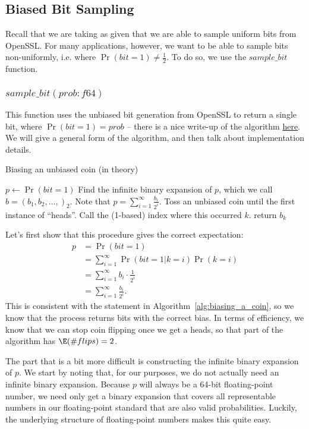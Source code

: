 \documentclass[11pt]{scrartcl} %
\begin{document}
\subsection{Biased Bit Sampling}
Recall that we are taking as given that we are able to sample uniform bits from OpenSSL.
For many applications, however, we want to be able to sample bits non-uniformly,
i.e. where $\Pr(bit = 1) \neq \frac{1}{2}$. To do so, we use the $sample\_bit$ function.

\subsubsection{$sample\_bit(prob: f64)$}
This function uses the unbiased bit generation from OpenSSL to return a single bit, where $\Pr(bit = 1) = prob$ --
there is a nice write-up of the algorithm \href{https://amakelov.wordpress.com/2013/10/10/arbitrarily-biasing-a-coin-in-2-expected-tosses/}{here}.
We will give a general form of the algorithm, and then talk about implementation details.
\begin{algorithm}[H]
	\caption{Biasing an unbiased coin (in theory)}
	\label{alg:biasing_a_coin_theory}
	\begin{algorithmic}[1]
		\State $p \gets \Pr(bit = 1)$
		\State Find the infinite binary expansion of $p$, which we call $b = (b_1, b_2, \hdots,)_2$.
		Note that $p = \sum_{i=1}^{\infty}\frac{b_i}{2^i}$.
		\State Toss an unbiased coin until the first instance of ``heads''. Call the (1-based) index where this occurred $k$.
		\State return $b_k$
	\end{algorithmic}
\end{algorithm}
Let's first show that this procedure gives the correct expectation:
\begin{align*}
	p &= \Pr(bit = 1) \\
		 &= \sum_{i=1}^{\infty} \Pr(bit = 1 \vert k = i) \Pr(k = i) \\
		 &= \sum_{i=1}^{\infty} b_i \cdot \frac{1}{2^i} \\
		 &= \sum_{i=1}^{\infty}\frac{b_i}{2^i}.
\end{align*}
This is consistent with the statement in Algorithm~\ref{alg:biasing_a_coin}, so we know that
the process returns bits with the correct bias.
In terms of efficiency, we know that we can stop coin flipping once we get a heads,
so that part of the algorithm has $\E(\# flips) = 2$. \newline

The part that is a bit more difficult is constructing the infinite binary expansion of $p$.
We start by noting that, for our purposes, we do not actually need an infinite binary expansion.
Because $p$ will always be a 64-bit floating-point number, we need only get a binary
expansion that covers all representable numbers in our floating-point standard that are
also valid probabilities.
Luckily, the underlying structure of floating-point numbers makes this quite easy. \newline
\end{document}
